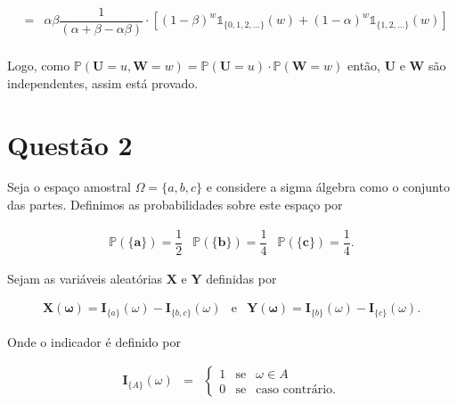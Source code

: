 \documentclass[a4paper, 11pt]{article}
\begin{document}
\begin{equation*}
\begin{array}{lclll}
& = & \alpha\beta  \dfrac{1}{(\alpha + \beta - \alpha\beta)} \cdot \left[(1-\beta)^{w} \mathds{1}_{\{0,1,2,\ldots\}}(w) + (1-\alpha)^{w} \mathds{1}_{\{1,2,\ldots\}}(w) \right] \\[25pt]

\end{array}
\end{equation*}

Logo, como $\mathds{P}(\mathbf{U} = u, \mathbf{W} = w) = \mathds{P}(\mathbf{U} = u)\cdot\mathds{P}(\mathbf{W} = w)$ então, $\mathbf{U}$ e $\mathbf{W}$ são independentes, assim está provado.

\section*{Questão 2} Seja o espaço amostral $\Omega = \{a,b,c\}$ e considere a sigma álgebra como o conjunto das partes. Definimos as probabilidades sobre este espaço por

\begin{equation*}
\begin{array}{lclll}
\mathds{P}(\mathbf{\{a\}}) = \dfrac{1}{2} & \mathds{P}(\mathbf{\{b\}}) = \dfrac{1}{4} & \mathds{P}(\mathbf{\{c\}}) = \dfrac{1}{4}.
\end{array}
\end{equation*}

Sejam as variáveis aleatórias $\mathbf{X}$ e $\mathbf{Y}$ definidas por

\begin{equation*}
\begin{array}{lclll}
\mathbf{X}(\mathbf{\omega}) = \mathbf{I}_{\{a\}}(\omega) - \mathbf{I}_{\{b,c\}}(\omega) & \mbox{e} & \mathbf{Y}(\mathbf{\omega}) = \mathbf{I}_{\{b\}}(\omega) - \mathbf{I}_{\{c\}}(\omega).
\end{array}
\end{equation*}

Onde o indicador é definido por

\begin{equation*}
\begin{array}{lcllllll}
\mathbf{I}_{\{A\}}(\omega) & = & \left\{
    \begin{array}{rrlc}
         1 & \mbox{se} & \omega \in A\\
         0 & \mbox{se} & \mbox{caso contrário}.
    \end{array}
\right. \\
\end{array}
\end{equation*}
\end{document}
